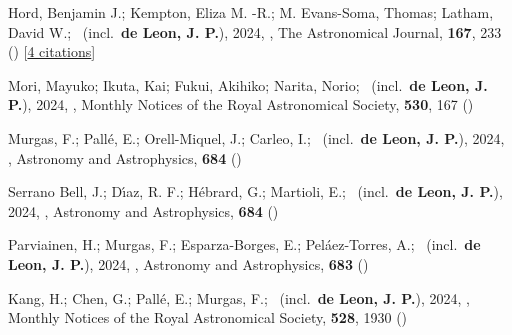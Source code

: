 \item[{\color{numcolor}\scriptsize64}] Hord, Benjamin J.; Kempton, Eliza M. -R.; M. Evans-Soma, Thomas; Latham, David W.; \etal\ (incl.\ \textbf{de Leon, J. P.}), 2024, , The Astronomical Journal, \textbf{167}, 233 () [\href{https://ui.adsabs.harvard.edu/abs/2024AJ....167..233H}{4 citations}]

\item[{\color{numcolor}\scriptsize63}] Mori, Mayuko; Ikuta, Kai; Fukui, Akihiko; Narita, Norio; \etal\ (incl.\ \textbf{de Leon, J. P.}), 2024, , Monthly Notices of the Royal Astronomical Society, \textbf{530}, 167 ()

\item[{\color{numcolor}\scriptsize62}] Murgas, F.; Pall{\'e}, E.; Orell-Miquel, J.; Carleo, I.; \etal\ (incl.\ \textbf{de Leon, J. P.}), 2024, , Astronomy and Astrophysics, \textbf{684} ()

\item[{\color{numcolor}\scriptsize61}] Serrano Bell, J.; D{\'\i}az, R. F.; H{\'e}brard, G.; Martioli, E.; \etal\ (incl.\ \textbf{de Leon, J. P.}), 2024, , Astronomy and Astrophysics, \textbf{684} ()

\item[{\color{numcolor}\scriptsize60}] Parviainen, H.; Murgas, F.; Esparza-Borges, E.; Pel{\'a}ez-Torres, A.; \etal\ (incl.\ \textbf{de Leon, J. P.}), 2024, , Astronomy and Astrophysics, \textbf{683} ()

\item[{\color{numcolor}\scriptsize59}] Kang, H.; Chen, G.; Pall{\'e}, E.; Murgas, F.; \etal\ (incl.\ \textbf{de Leon, J. P.}), 2024, , Monthly Notices of the Royal Astronomical Society, \textbf{528}, 1930 ()

